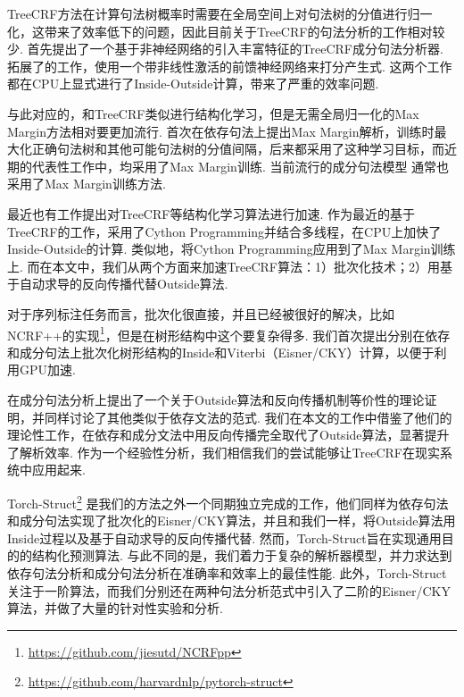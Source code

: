 TreeCRF方法在计算句法树概率时需要在全局空间上对句法树的分值进行归一化，这带来了效率低下的问题，因此目前关于TreeCRF的句法分析的工作相对较少.
\citet{finkel-etal-2008-efficient}首先提出了一个基于非神经网络的引入丰富特征的TreeCRF成分句法分析器.
\citet{durrett-klein-2015-neural}拓展了\citet{finkel-etal-2008-efficient}的工作，使用一个带非线性激活的前馈神经网络来打分产生式.
这两个工作都在CPU上显式进行了Inside-Outside计算，带来了严重的效率问题.

与此对应的，和TreeCRF类似进行结构化学习，但是无需全局归一化的Max Margin方法相对要更加流行.
\citet{taskar-etal-2004-max}首次在依存句法上提出Max Margin解析，训练时最大化正确句法树和其他可能句法树的分值间隔，后来\citet{mcdonald-etal-2005-online,mcdonald-etal-2005-online}都采用了这种学习目标，而近期的代表性工作中，\citet{wang-chang-2016-graph,kiperwasser-goldberg-2016-simple}均采用了Max Margin训练.
当前流行的成分句法模型 \citep{stern-etal-2017-minimal,kitaev-klein-2018-constituency,zhou-zhao-2019-head}通常也采用了Max Margin训练方法.

最近也有工作提出对TreeCRF等结构化学习算法进行加速.
\citet{zhang-etal-2017-dependency-parsing,jiang-etal-2018-supervised,li-etal-2019-semi-supervised}作为最近的基于TreeCRF的工作，采用了Cython Programming并结合多线程，在CPU上加快了Inside-Outside的计算.
类似地，\citet{kitaev-klein-2018-constituency}将Cython Programming应用到了Max Margin训练上.
而在本文中，我们从两个方面来加速TreeCRF算法：1）批次化技术；2）用基于自动求导的反向传播代替Outside算法.

对于序列标注任务而言，批次化很直接，并且已经被很好的解决，比如NCRF++的实现\footnote{\url{https://github.com/jiesutd/NCRFpp}}，但是在树形结构中这个要复杂得多.
我们首次提出分别在依存和成分句法上批次化树形结构的Inside和Viterbi（Eisner/CKY）计算，以便于利用GPU加速.

\citet{eisner-2016-inside}在成分句法分析上提出了一个关于Outside算法和反向传播机制等价性的理论证明，并同样讨论了其他类似于依存文法的范式.
我们在本文的工作中借鉴了他们的理论性工作，在依存和成分文法中用反向传播完全取代了Outside算法，显著提升了解析效率.
作为一个经验性分析，我们相信我们的尝试能够让TreeCRF在现实系统中应用起来.

Torch-Struct\footnote{\url{https://github.com/harvardnlp/pytorch-struct}} \citep{rush-2020-torch}是我们的方法之外一个同期独立完成的工作，他们同样为依存句法和成分句法实现了批次化的Eisner/CKY算法，并且和我们一样，将Outside算法用Inside过程以及基于自动求导的反向传播代替.
然而，Torch-Struct旨在实现通用目的的结构化预测算法.
与此不同的是，我们着力于复杂的解析器模型，并力求达到依存句法分析和成分句法分析在准确率和效率上的最佳性能.
此外，Torch-Struct关注于一阶算法，而我们分别还在两种句法分析范式中引入了二阶的Eisner/CKY算法，并做了大量的针对性实验和分析.

